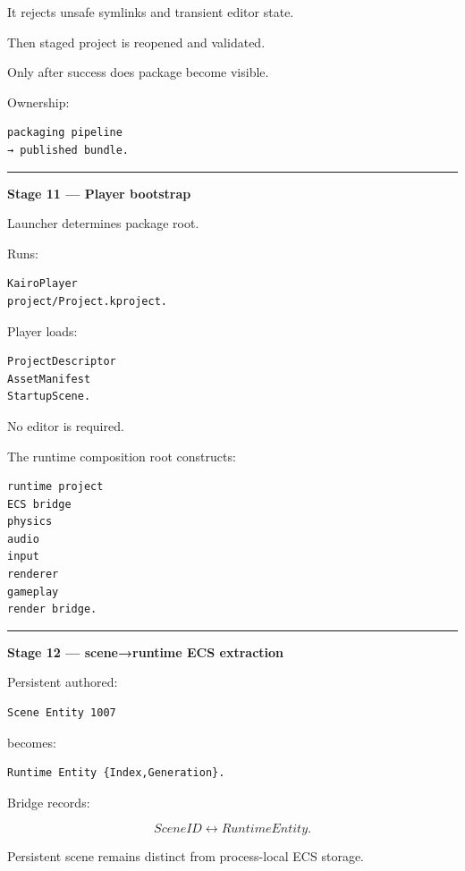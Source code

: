 It rejects unsafe symlinks and transient editor state.

Then staged project is reopened and validated.

Only after success does package become visible.

Ownership:

\begin{verbatim}
packaging pipeline
→ published bundle.
\end{verbatim}

\begin{center}\rule{0.5\linewidth}{0.5pt}\end{center}

\textbf{Stage 11 --- Player bootstrap}

Launcher determines package root.

Runs:

\begin{verbatim}
KairoPlayer
project/Project.kproject.
\end{verbatim}

Player loads:

\begin{verbatim}
ProjectDescriptor
AssetManifest
StartupScene.
\end{verbatim}

No editor is required.

The runtime composition root constructs:

\begin{verbatim}
runtime project
ECS bridge
physics
audio
input
renderer
gameplay
render bridge.
\end{verbatim}

\begin{center}\rule{0.5\linewidth}{0.5pt}\end{center}

\textbf{Stage 12 --- scene→runtime ECS extraction}

Persistent authored:

\begin{verbatim}
Scene Entity 1007
\end{verbatim}

becomes:

\begin{verbatim}
Runtime Entity {Index,Generation}.
\end{verbatim}

Bridge records:

\[
SceneID
\leftrightarrow
RuntimeEntity.
\]

Persistent scene remains distinct from process-local ECS storage.

